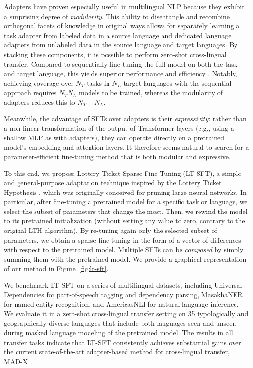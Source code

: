 Adapters have proven especially useful in multilingual NLP \citep{Bapna:2019emnlp,Ustun:2020emnlp,pfeiffer-etal-2020-mad,Vidoni:2020arxiv,pfeiffer-etal-2021-unks,ansell-etal-2021-mad-g} because they exhibit a surprising degree of \textit{modularity}. This ability to disentangle and recombine orthogonal facets of knowledge in original ways \citep{TACL2123,ponti2021inductive} allows for separately learning a task adapter from labeled data in a source language and dedicated language adapters from unlabeled data in the source language and target languages. By stacking these components, it is possible to perform zero-shot cross-lingual transfer. Compared to sequentially fine-tuning the full model on both the task and target language, this yields superior performance and efficiency \citep{pfeiffer-etal-2020-mad}. Notably, achieving coverage over $N_T$ tasks in $N_L$ target languages with the sequential approach requires $N_T N_L$ models to be trained, whereas the modularity of adapters reduces this to $N_T + N_L$.

Meanwhile, the advantage of SFTs over adapters is their \textit{expressivity}: rather than a non-linear transformation of the output of Transformer layers (e.g., using a shallow MLP as with adapters), they can operate directly on a pretrained model's embedding and attention layers. It therefore seems natural to search for a parameter-efficient fine-tuning method that is both modular and expressive.

To this end, we propose Lottery Ticket Sparse Fine-Tuning (LT-SFT), a simple and general-purpose adaptation technique inspired by the Lottery Ticket Hypothesis \citep[LTH;][]{frankle2018the,pmlr-v119-malach20a}, which was originally conceived for pruning large neural networks. In particular, after fine-tuning a pretrained model for a specific task or language, we select the subset of parameters that change the most. Then, we rewind the model to its pretrained initialization (without setting any value to zero, contrary to the original LTH algorithm). By re-tuning again only the selected subset of parameters, we obtain a sparse fine-tuning in the form of a vector of differences with respect to the pretrained model. Multiple SFTs can be \textit{composed} by simply summing them with the pretrained model. We provide a graphical representation of our method in Figure~\ref{fig:lt-sft}.

We benchmark LT-SFT on a series of multilingual datasets, including Universal Dependencies \citep{ud-2.7} for part-of-speech tagging and dependency parsing, MasakhaNER \citep{adelani-etal-2021-masakhaner} for named entity recognition, and AmericasNLI \citep{ebrahimi-etal-2021-americasnli} for natural language inference. We evaluate it in a zero-shot cross-lingual transfer setting on 35 typologically and geographically diverse languages that include both languages seen and unseen during masked language modeling of the pretrained model. The results in all transfer tasks indicate that LT-SFT consistently achieves substantial gains over the current state-of-the-art adapter-based method for cross-lingual transfer, MAD-X \citep{pfeiffer-etal-2020-mad}.


